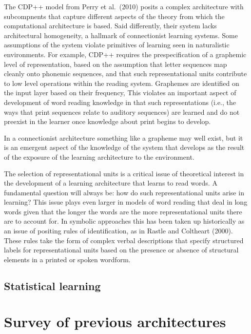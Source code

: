 \documentclass[
  american,
  man,floatsintext]{apa6}
\begin{document}
The CDP++ model from Perry et al.~(2010) posits a complex architecture with subcompnents that capture different aspects of the theory from which the computational architecture is based. Said differently, their system lacks architectural homogeneity, a hallmark of connectionist learning systems. Some assumptions of the system violate primitives of learning seen in naturalistic environments. For example, CDP++ requires the prespecification of a graphemic level of representation, based on the assumption that letter sequences map cleanly onto phonemic sequences, and that such representational units contribute to low level operations within the reading system. Graphemes are identified on the input layer based on their frequency, This violates an important aspect of development of word reading knowledge in that such representations (i.e., the ways that print sequences relate to auditory sequences) are learned and do not preexist in the learner once knowledge about print begins to develop.

In a connectionist architecture something like a grapheme may well exist, but it is an emergent aspect of the knowledge of the system that develops as the result of the exposure of the learning architecture to the environment.

The selection of representational units is a critical issue of theoretical interest in the development of a learning architecture that learns to read words. A fundamental question will always be: how do such representational units arise in learning? This issue plays even larger in models of word reading that deal in long words given that the longer the words are the more representational units there are to account for. In symbolic approaches this has been taken up historically as an issue of positing rules of identification, as in Rastle and Coltheart (2000). These rules take the form of complex verbal descriptions that specify structured labels for representational units based on the presence or absence of structural elements in a printed or spoken wordform.

\hypertarget{statistical-learning}{%
\subsection{Statistical learning}\label{statistical-learning}}

\hypertarget{survey-of-previous-architectures}{%
\section{Survey of previous architectures}\label{survey-of-previous-architectures}}
\end{document}

